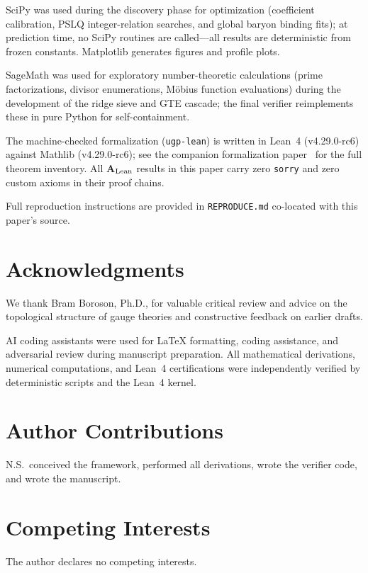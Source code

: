 \documentclass[11pt]{article}
\theoremstyle{remark}
\newcommand{\CatAL}{\textbf{A}$_{\rm Lean}$}
\begin{document}
SciPy was used during the discovery phase for optimization (coefficient calibration, PSLQ integer-relation searches, and global baryon binding fits); at prediction time, no SciPy routines are called---all results are deterministic from frozen constants.
Matplotlib generates figures and profile plots.

SageMath was used for exploratory number-theoretic calculations (prime factorizations, divisor enumerations, M\"obius function evaluations) during the development of the ridge sieve and GTE cascade; the final verifier reimplements these in pure Python for self-containment.

The machine-checked formalization (\texttt{ugp-lean}) is written in Lean~4 (v4.29.0-rc6) against Mathlib (v4.29.0-rc6); see the companion formalization paper~\cite{SpivackUGPFormalization} for the full theorem inventory.  All \CatAL{} results in this paper carry zero \texttt{sorry} and zero custom axioms in their proof chains.

Full reproduction instructions are provided in \texttt{REPRODUCE.md} co-located with this paper's source.

\section*{Acknowledgments}
We thank Bram Boroson, Ph.D., for valuable critical review and advice on the topological structure of gauge theories and constructive feedback on earlier drafts.

AI coding assistants were used for \LaTeX{} formatting, coding assistance, and adversarial review during manuscript preparation. All mathematical derivations, numerical computations, and Lean~4 certifications were independently verified by deterministic scripts and the Lean~4 kernel.

\section*{Author Contributions}
N.S.\ conceived the framework, performed all derivations, wrote the verifier code, and wrote the manuscript.

\section*{Competing Interests}
The author declares no competing interests.
\end{document}
